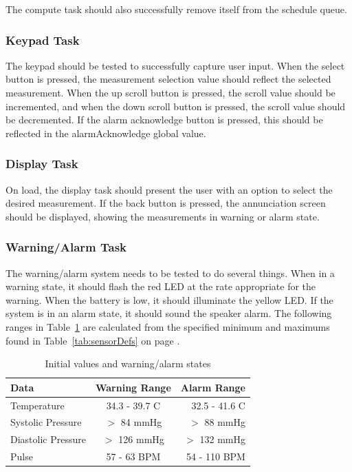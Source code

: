 \documentclass[12pt]{article} %
\begin{document}
    The compute task should also successfully remove itself from the schedule
    queue.

    \subsubsection{Keypad Task} 
    The keypad should be tested to successfully
    capture user input.  When the select button is pressed, the measurement
    selection value should reflect the selected measurement.  When the up
    scroll button is pressed, the scroll value should be incremented, and when
    the down scroll button is pressed, the scroll value should be decremented.  
    If the alarm acknowledge button is pressed, this should be reflected in 
    the alarmAcknowledge global value.

    \subsubsection{Display Task}
    On load, the display task should present the user with an option to select
    the desired measurement.  If the back button is pressed, the annunciation
    screen should be displayed, showing the measurements in warning or alarm
    state.  

    \subsubsection{Warning/Alarm Task} 
    The warning/alarm system needs to be tested to do several things. When in a
    warning state, it should flash the red LED at the rate appropriate for the
    warning. When the battery is low, it should illuminate the yellow LED. If the
    system is in an alarm state, it should sound the speaker alarm. The following
    ranges in Table~\ref{tab:ranges} are calculated from the specified minimum and
    maximums found in Table~\ref{tab:sensorDefs} on page \pageref{tab:sensorDefs}.
    \begin{table}[h]
      \centering
      \begin{tabular}{lcr} 
	\toprule
	Data & Warning Range & Alarm Range \\
	\midrule
	Temperature & 34.3 - 39.7 C & 32.5 - 41.6 C\\
	Systolic Pressure & $>$ 84 mmHg & $>$ 88 mmHg\\
	Diastolic Pressure & $>$ 126 mmHg & $>$ 132 mmHg\\
	Pulse & 57 - 63 BPM & 54 - 110 BPM \\
	\bottomrule
      \end{tabular}
      \caption{Initial values and warning/alarm states}
      \label{tab:ranges}
    \end{table}
\end{document}
